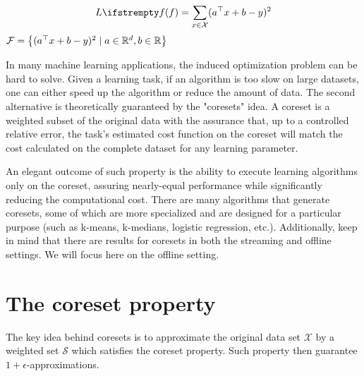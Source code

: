 \begin{example}
    \begin{equation*}
        \loss{\query} = \sum_{x\in \mathcal{X}} (a\T x +b -y)^2
    \end{equation*}
    $\mathcal{F} = \left\{(a^\top x + b -y)^2 \mid a \in \mathbb{R}^d, b \in \mathbb{R}\right\}$
\end{example}
    

In many machine learning applications, the induced optimization problem can be hard to solve. Given a learning task, if an algorithm is too slow on large datasets, one can either speed up the algorithm or reduce the amount of data.
The second alternative is theoretically guaranteed by the "coresets" idea.
A coreset is a weighted subset of the original data with the assurance that, up to a controlled relative error, the task's estimated cost function on the coreset will match the cost calculated on the complete dataset for any learning parameter.

An elegant outcome of such property is the ability to execute learning algorithms only on the coreset, assuring nearly-equal performance while significantly reducing the computational cost. There are many algorithms that generate coresets, some of which are more specialized and are designed for a particular purpose (such as k-means, k-medians, logistic regression, etc.). Additionally, keep in mind that there are results for coresets in both the streaming and offline settings. We will focus here on the offline setting.


\section{The coreset property}

The key idea behind coresets is to approximate the original data
set $\mathcal{X}$ by a weighted set $\mathcal{S}$ which satisfies the coreset property. Such property then guarantee $1+\epsilon$-approximations.

